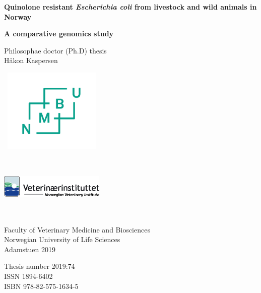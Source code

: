 \graphicspath{ {./images/} }
\begin{titlepage}
   \begin{center}
       
       \Huge
       
       \textbf{Quinolone resistant \textit{Escherichia coli} from livestock and wild animals in Norway}
 
       \vspace{0.5cm}
       
       \LARGE
       \textbf{A comparative genomics study}
       
       \vspace{1cm}
       
       \small
       Philosophae doctor (Ph.D) thesis\\
       Håkon Kaspersen
 
       \vspace{1cm}
       
       \includegraphics[height=4cm, width=5cm]{nmbu}
       
       \vspace{1cm}
       
       \includegraphics[height=3cm, width=5cm]{vetinst}
       
       \vfill
       
       \vspace{1cm}
       
       Faculty of Veterinary Medicine and Biosciences\\
       Norwegian University of Life Sciences\\
       Adamstuen 2019
 
       \vspace{1cm}
 
       Thesis number 2019:74\\
       ISSN 1894-6402\\
       ISBN 978-82-575-1634-5
 
   \end{center}
\end{titlepage}
